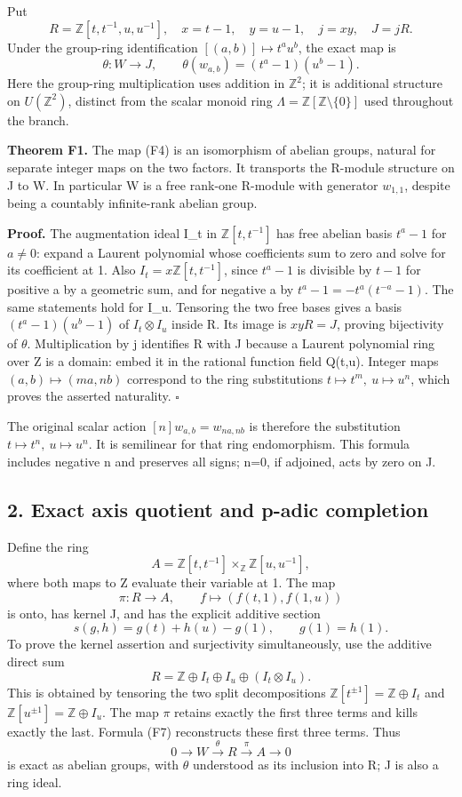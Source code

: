 \documentclass[
]{article}
\begin{document}
Put \[
R=\mathbb Z[t,t^{-1},u,u^{-1}],\quad x=t-1,\quad y=u-1,
\quad j=xy,\quad J=jR.
\tag{F3}
\] Under the group-ring identification \([(a,b)]\mapsto t^a u^b\), the
exact map is \[
\theta:W\longrightarrow J,\qquad
\theta(w_{a,b})=(t^a-1)(u^b-1).
\tag{F4}
\] Here the group-ring multiplication uses addition in \(\mathbb Z^2\);
it is additional structure on \(U(\mathbb Z^2)\), distinct from the
scalar monoid ring \(\Lambda=\mathbb Z[\mathbb Z\setminus\{0\}]\) used
throughout the branch.

\textbf{Theorem F1.} The map (F4) is an isomorphism of abelian groups,
natural for separate integer maps on the two factors. It transports the
R-module structure on J to W. In particular W is a free rank-one
R-module with generator \(w_{1,1}\), despite being a countably
infinite-rank abelian group.

\textbf{Proof.} The augmentation ideal I\_t in \(\mathbb Z[t,t^{-1}]\)
has free abelian basis \(t^a-1\) for \(a\ne0\): expand a Laurent
polynomial whose coefficients sum to zero and solve for its coefficient
at 1. Also \(I_t=x\mathbb Z[t,t^{-1}]\), since \(t^a-1\) is divisible by
\(t-1\) for positive a by a geometric sum, and for negative a by
\(t^a-1=-t^a(t^{-a}-1)\). The same statements hold for I\_u. Tensoring
the two free bases gives a basis \((t^a-1)(u^b-1)\) of
\(I_t\otimes I_u\) inside R. Its image is \(xyR=J\), proving bijectivity
of \(\theta\). Multiplication by j identifies R with J because a Laurent
polynomial ring over Z is a domain: embed it in the rational function
field Q(t,u). Integer maps \((a,b)\mapsto(ma,nb)\) correspond to the
ring substitutions \(t\mapsto t^m,\ u\mapsto u^n\), which proves the
asserted naturality. \(\square\)

The original scalar action \([n]w_{a,b}=w_{na,nb}\) is therefore the
substitution \(t\mapsto t^n,\ u\mapsto u^n\). It is semilinear for that
ring endomorphism. This formula includes negative n and preserves all
signs; n=0, if adjoined, acts by zero on J.

\subsection{2. Exact axis quotient and p-adic
completion}\label{exact-axis-quotient-and-p-adic-completion}

Define the ring \[
A=\mathbb Z[t,t^{-1}]\times_{\mathbb Z}\mathbb Z[u,u^{-1}],
\tag{F5}
\] where both maps to Z evaluate their variable at 1. The map \[
\pi:R\longrightarrow A,\qquad f\longmapsto(f(t,1),f(1,u))
\tag{F6}
\] is onto, has kernel J, and has the explicit additive section \[
s(g,h)=g(t)+h(u)-g(1),\qquad g(1)=h(1).
\tag{F7}
\] To prove the kernel assertion and surjectivity simultaneously, use
the additive direct sum \[
R=\mathbb Z\oplus I_t\oplus I_u\oplus(I_t\otimes I_u).
\tag{F8}
\] This is obtained by tensoring the two split decompositions
\(\mathbb Z[t^{\pm1}]=\mathbb Z\oplus I_t\) and
\(\mathbb Z[u^{\pm1}]=\mathbb Z\oplus I_u\). The map \(\pi\) retains
exactly the first three terms and kills exactly the last. Formula (F7)
reconstructs these first three terms. Thus \[
0\longrightarrow W\xrightarrow{\theta}R\xrightarrow{\pi}A\longrightarrow0
\tag{F9}
\] is exact as abelian groups, with \(\theta\) understood as its
inclusion into R; J is also a ring ideal.
\end{document}
